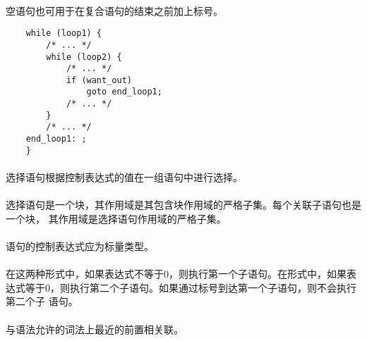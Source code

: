 {\paragraph{}
\ex 空语句也可用于在复合语句的结束\tm{\}}之前加上标号。
\begin{lstlisting}
    while (loop1) {
        /* ... */
        while (loop2) {
            /* ... */
            if (want_out)
                goto end_loop1;
            /* ... */
        }
        /* ... */
    end_loop1: ;
    }
\end{lstlisting}


\syntax
\paragraph{}

\semantic
\paragraph{}
选择语句根据控制表达式的值在一组语句中进行选择。

\paragraph{}
选择语句是一个块，其作用域是其包含块作用域的严格子集。每个关联子语句也是一个块，
其作用域是选择语句作用域的严格子集。

\constraint
\paragraph{}
语句的控制表达式应为标量类型。

\semantic
\paragraph{}
在这两种形式中，如果表达式不等于0，则执行第一个子语句。在形式中，如果表
达式等于0，则执行第二个子语句。如果通过标号到达第一个子语句，则不会执行第二个子
语句。

\paragraph{}
与语法允许的词法上最近的前置相关联。

}
